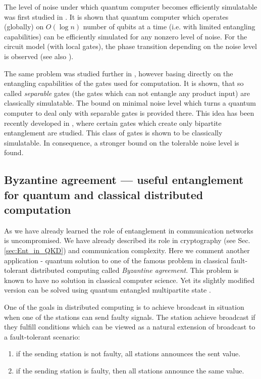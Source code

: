 \documentclass[rmp,12pt,preprint]{revtex4-2}
\begin{document}
The level of noise under which quantum computer becomes efficiently
simulatable was first studied in \cite{Aharonov-comp}. It is shown
that quantum computer which operates (globally) on $O(\log n)$ number
of qubits at a time (i.e. with limited entangling capabilities) can be
efficiently simulated for any nonzero level of noise. For the circuit
model (with local gates), the phase transition depending on the noise
level is observed (see also \cite{Aharonov-comp2}).

The same problem was studied further in \cite{HarrowN2003-robust},
however basing directly on the entangling capabilities of the gates
used for computation. It is shown, that so called {\it separable}
gates (the gates which can not entangle any product input) are
classically simulatable. The bound on minimal noise level which turns
a quantum computer to deal only with separable gates is provided
there. This idea has been recently developed in
\cite{VirmaniHP-comp-ent2005}, where certain gates which create only
bipartite entanglement are studied. This class of gates is shown to be
classically simulatable. In consequence, a stronger bound on the
tolerable noise level is found.



\subsection{Byzantine agreement --- useful entanglement for quantum and
classical distributed computation}

As we have already learned the role of entanglement  in
communication networks is uncompromised. We have already described
its role in cryptography (see Sec. \ref{sec:Ent_in_QKD}) and
communication complexity. Here we comment another application -
quantum solution to one of the famous problem in classical
fault-tolerant distributed computing called {\it Byzantine
agreement}. This problem is known to have no solution in classical
computer science. Yet its slightly modified version can be solved
using quantum entangled multipartite state \cite{Gisin01-byzantine}.

One of the goals in distributed computing is to achieve broadcast in
situation when one of the stations can send faulty signals. The
station achieve broadcast if they fulfill conditions which can be
viewed as a natural extension of broadcast to a fault-tolerant
scenario:

\begin{enumerate}
\item if the sending station is not faulty, all stations announces the
  sent value.
\item if the sending station is faulty, then all stations announce the
  same value.
\end{enumerate}
\end{document}
